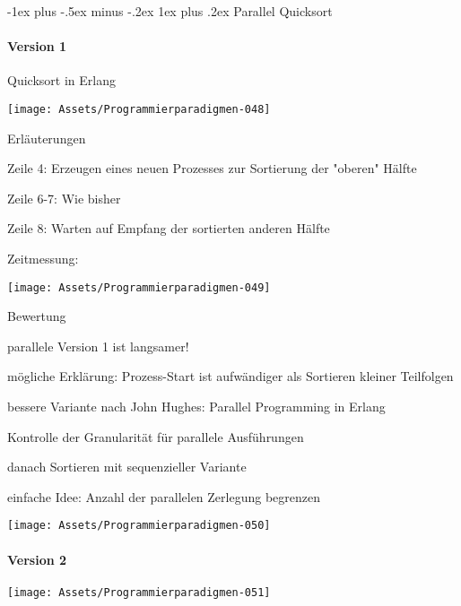 \documentclass[10pt]{article}
\makeatletter
\renewcommand{\subsubsection}{\@startsection{subsubsection}{3}{0mm}%
                                {-1ex plus -.5ex minus -.2ex}%
                                {1ex plus .2ex}%
                                {\normalfont\small\bfseries}}
\makeatother
\begin{document}
\subsubsection{Parallel Quicksort}
\paragraph{Version 1}
Quicksort in Erlang
\begin{center}
  \texttt{[image: Assets/Programmierparadigmen-048]}
\end{center}

Erläuterungen
\begin{itemize*}
  \item Zeile 4: Erzeugen eines neuen Prozesses zur Sortierung der "oberen" Hälfte
  \item Zeile 6-7: Wie bisher
  \item Zeile 8: Warten auf Empfang der sortierten anderen Hälfte
\end{itemize*}
Zeitmessung:
\begin{center}
  \texttt{[image: Assets/Programmierparadigmen-049]}
\end{center}

Bewertung
\begin{itemize*}
  \item parallele Version 1 ist langsamer!
  \item mögliche Erklärung: Prozess-Start ist aufwändiger als Sortieren kleiner Teilfolgen
  \item bessere Variante nach John Hughes: Parallel Programming in Erlang
  \begin{itemize*}
    \item Kontrolle der Granularität für parallele Ausführungen
    \item danach Sortieren mit sequenzieller Variante
    \item einfache Idee: Anzahl der parallelen Zerlegung begrenzen
  \end{itemize*}
\end{itemize*}
\begin{center}
  \texttt{[image: Assets/Programmierparadigmen-050]}
\end{center}

\paragraph{Version 2}
\begin{center}
  \texttt{[image: Assets/Programmierparadigmen-051]}
\end{center}
\end{document}
